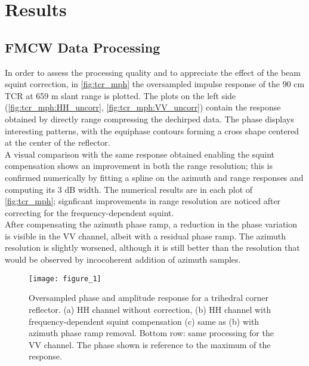 \section{Results}\label{sec:results}
\subsection{FMCW Data Processing}\label{sec:res_SLC}
In order to assess the processing quality and to appreciate the effect of the beam squint correction, in  \autoref{fig:tcr_mph} the oversampled impulse response of the 90 cm TCR at 659 m slant range is plotted. The plots on the left side (\autoref{fig:tcr_mph:HH_uncorr}, \autoref{fig:tcr_mph:VV_uncorr}) contain the response obtained by directly range compressing the dechirped data. The phase displays interesting patterns, with the equiphase contours forming a cross shape centered at the center of the reflector.\\ A visual comparison with the same response obtained enabling the squint compensation shows an improvement in both the range resolution; this is confirmed numerically by fitting a spline on the azimuth and range responses and computing its 3 dB width. The numerical results are in each plot of \autoref{fig:tcr_mph}; signficant improvements in range resolution are noticed after correcting for the frequency-dependent squint.\\ After compensating the azimuth phase ramp, a reduction in the phase variation is visible in the VV channel, albeit with a residual phase ramp. The azimuth resolution is slightly worsened, although it is still better than the resolution that would be observed by incocoherent addition of azimuth samples.
\def\chutzepref{20160914_145059}
\begin{figure*}[ht]
	\centering
	\texttt{[image: figure\_1]}
	\caption{Oversampled phase and amplitude response for a trihedral corner reflector. (a) HH channel without correction, (b) HH channel with frequency-dependent squint compensation (c) same as (b) with azimuth phase ramp removal. Bottom row: same processing for the VV channel.
	The phase shown is reference to the maximum of the response.}
	\label{fig:tcr_mph}
\end{figure*}
